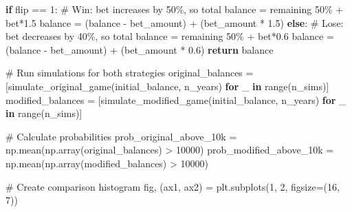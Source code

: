 \documentclass[
  letterpaper,
  DIV=11,
  numbers=noendperiod]{scrartcl}
\newenvironment{Shaded}{\begin{snugshade}}{\end{snugshade}}
\newcommand{\BuiltInTok}[1]{\textcolor[rgb]{0.00,0.23,0.31}{#1}}
\newcommand{\CommentTok}[1]{\textcolor[rgb]{0.37,0.37,0.37}{#1}}
\newcommand{\ControlFlowTok}[1]{\textcolor[rgb]{0.00,0.23,0.31}{\textbf{#1}}}
\newcommand{\DecValTok}[1]{\textcolor[rgb]{0.68,0.00,0.00}{#1}}
\newcommand{\FloatTok}[1]{\textcolor[rgb]{0.68,0.00,0.00}{#1}}
\newcommand{\KeywordTok}[1]{\textcolor[rgb]{0.00,0.23,0.31}{\textbf{#1}}}
\newcommand{\NormalTok}[1]{\textcolor[rgb]{0.00,0.23,0.31}{#1}}
\newcommand{\OperatorTok}[1]{\textcolor[rgb]{0.37,0.37,0.37}{#1}}
\theoremstyle{definition}
\theoremstyle{remark}
\begin{document}
\begin{Shaded}
\begin{Highlighting}[]
        \ControlFlowTok{if}\NormalTok{ flip }\OperatorTok{==} \DecValTok{1}\NormalTok{:}
            \CommentTok{\# Win: bet increases by 50\%, so total balance = remaining 50\% + bet*1.5}
\NormalTok{            balance }\OperatorTok{=}\NormalTok{ (balance }\OperatorTok{{-}}\NormalTok{ bet\_amount) }\OperatorTok{+}\NormalTok{ (bet\_amount }\OperatorTok{*} \FloatTok{1.5}\NormalTok{)}
        \ControlFlowTok{else}\NormalTok{:}
            \CommentTok{\# Lose: bet decreases by 40\%, so total balance = remaining 50\% + bet*0.6}
\NormalTok{            balance }\OperatorTok{=}\NormalTok{ (balance }\OperatorTok{{-}}\NormalTok{ bet\_amount) }\OperatorTok{+}\NormalTok{ (bet\_amount }\OperatorTok{*} \FloatTok{0.6}\NormalTok{)}
    \ControlFlowTok{return}\NormalTok{ balance}

\CommentTok{\# Run simulations for both strategies}
\NormalTok{original\_balances }\OperatorTok{=}\NormalTok{ [simulate\_original\_game(initial\_balance, n\_years) }\ControlFlowTok{for}\NormalTok{ \_ }\KeywordTok{in} \BuiltInTok{range}\NormalTok{(n\_sims)]}
\NormalTok{modified\_balances }\OperatorTok{=}\NormalTok{ [simulate\_modified\_game(initial\_balance, n\_years) }\ControlFlowTok{for}\NormalTok{ \_ }\KeywordTok{in} \BuiltInTok{range}\NormalTok{(n\_sims)]}

\CommentTok{\# Calculate probabilities}
\NormalTok{prob\_original\_above\_10k }\OperatorTok{=}\NormalTok{ np.mean(np.array(original\_balances) }\OperatorTok{\textgreater{}} \DecValTok{10000}\NormalTok{)}
\NormalTok{prob\_modified\_above\_10k }\OperatorTok{=}\NormalTok{ np.mean(np.array(modified\_balances) }\OperatorTok{\textgreater{}} \DecValTok{10000}\NormalTok{)}

\CommentTok{\# Create comparison histogram}
\NormalTok{fig, (ax1, ax2) }\OperatorTok{=}\NormalTok{ plt.subplots(}\DecValTok{1}\NormalTok{, }\DecValTok{2}\NormalTok{, figsize}\OperatorTok{=}\NormalTok{(}\DecValTok{16}\NormalTok{, }\DecValTok{7}\NormalTok{))}


\end{Highlighting}
\end{Shaded}
\end{document}
